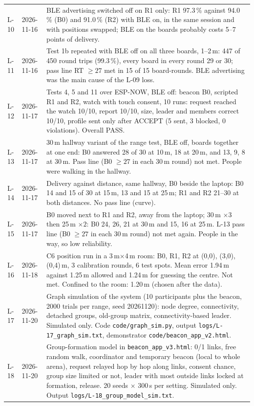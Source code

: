 \IfFileExists{IEEEtran.cls}{\documentclass[conference]{IEEEtran}}{\documentclass[10pt,twocolumn]{article}}
\begin{document}
\begin{table}[!t]
\begin{tabularx}{\textwidth}{@{}l l Y@{}}
L-10 & 2026-11-16 & BLE advertising switched off on R1 only: R1 97.3\,\% against 94.0\,\% (B0) and 91.0\,\% (R2) with BLE on, in the same session and with positions swapped; BLE on the boards probably costs 5--7 points of delivery.\\
L-11 & 2026-11-16 & Test 1b repeated with BLE off on all three boards, 1--2\,m: 447 of 450 round trips (99.3\,\%), every board in every round 29 or 30; pass line RT $\ge 27$ met in 15 of 15 board-rounds. BLE advertising was the main cause of the L-09 loss.\\
L-12 & 2026-11-17 & Tests 4, 5 and 11 over ESP-NOW, BLE off: beacon B0, scripted R1 and R2, watch with touch consent, 10 runs: request reached the watch 10/10, report 10/10, size, leader and members correct 10/10, profile sent only after ACCEPT (5 sent, 3 blocked, 0 violations). Overall PASS.\\
L-13 & 2026-11-17 & 30\,m hallway variant of the range test, BLE off, boards together at one end: B0 answered 28 of 30 at 10\,m, 18 at 20\,m, and 13, 9, 8 at 30\,m. Pass line (B0 $\ge 27$ in each 30\,m round) not met. People were walking in the hallway.\\
L-14 & 2026-11-17 & Delivery against distance, same hallway, B0 beside the laptop: B0 14 and 15 of 30 at 15\,m, 13 and 15 at 25\,m; R1 and R2 21--30 at both distances. No pass line (curve).\\
L-15 & 2026-11-17 & B0 moved next to R1 and R2, away from the laptop; 30\,m $\times 3$ then 25\,m $\times 2$: B0 24, 26, 21 at 30\,m and 15, 16 at 25\,m. L-13 pass line (B0 $\ge 27$ in each 30\,m round) not met again. People in the way, so low reliability.\\
L-16 & 2026-11-18 & C6 position run in a 3\,m$\times$4\,m room: B0, R1, R2 at (0,0), (3,0), (0,4)\,m, 3 calibration rounds, 6 test spots. Mean error 1.94\,m against 1.25\,m allowed and 1.24\,m for guessing the centre. Not met. Confined to the room: 1.20\,m (chosen after the data).\\
L-17 & 2026-11-20 & Graph simulation of the system (10 participants plus the beacon, 2000 trials per range, seed 20261120): node degree, connectivity, detached groups, old-group matrix, connectivity-based leader. Simulated only. Code \texttt{code/graph\_sim.py}, output \texttt{logs/L-17\_graph\_sim.txt}, demonstrator \texttt{code/beacon\_app\_v2.html}.\\
L-18 & 2026-11-20 & Group-formation model in \texttt{beacon\_app\_v3.html}: 0/1 links, free random walk, coordinator and temporary beacon (local to whole arena), request relayed hop by hop along links, consent chance, group size limited or not, leader with most outside links locked at formation, release. 20 seeds $\times$ 300\,s per setting. Simulated only. Output \texttt{logs/L-18\_group\_model\_sim.txt}.\\

\end{tabularx}
\end{table}
\end{document}
